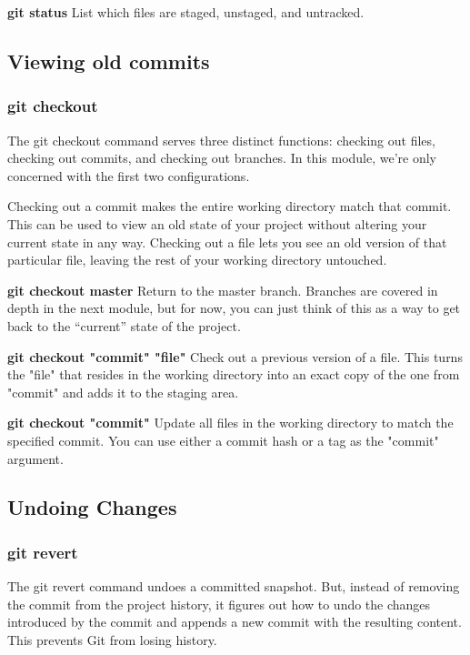\documentclass{article}
\begin{document}
        \textbf{git status}
        List which files are staged, unstaged, and untracked.

    \subsection{Viewing old commits}
    \subsubsection{git checkout}
        The git checkout command serves three distinct functions: checking out files, checking out commits, and checking out branches. In this module, we’re only concerned with the first two configurations.

        Checking out a commit makes the entire working directory match that commit. This can be used to view an old state of your project without altering your current state in any way. Checking out a file lets you see an old version of that particular file, leaving the rest of your working directory untouched.

        \textbf{git checkout master}
            Return to the master branch. Branches are covered in depth in the next module, but for now, you can just think of this as a way to get back to the “current” state of the project.

        \textbf{git checkout "commit" "file"}
        Check out a previous version of a file. This turns the "file" that resides in the working directory into an exact copy of the one from "commit" and adds it to the staging area.

        \textbf{git checkout "commit"}
        Update all files in the working directory to match the specified commit. You can use either a commit hash or a tag as the "commit" argument.

    \subsection{Undoing Changes}
    \subsubsection{git revert}

        The git revert command undoes a committed snapshot. But, instead of removing the commit from the project history, it figures out how to undo the changes introduced by the commit and appends a new commit with the resulting content. This prevents Git from losing history.
\end{document}

